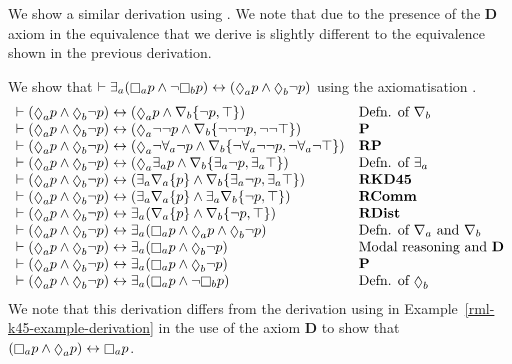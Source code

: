 \pagebreak

We show a similar derivation using \axiomRmlKD{}.
We note that due to the presence of the {\bf D} axiom in \axiomRmlKD{} the equivalence that we derive is slightly different to the equivalence shown in the previous derivation.

\begin{example}\label{rml-kd45-example-derivation}
We show that $\proves \somerefsA (\necessaryA \atomP \land \lnot \necessaryB \atomP) \iff (\possibleA \atomP \land \possibleB \lnot \atomP)$ using the axiomatisation \axiomRmlKD{}.
$$
\begin{array}{ll}
    \proves (\possibleA \atomP \land \possibleB \lnot \atomP) \iff (\possibleA \atomP \land \coversB \{\lnot \atomP, \top\}) & \text{Defn. of $\coversB$}\\
    \proves (\possibleA \atomP \land \possibleB \lnot \atomP) \iff (\possibleA \lnot \lnot \atomP \land \coversB \{\lnot \lnot \lnot \atomP, \lnot \lnot \top\}) & {\bf P}\\
    \proves (\possibleA \atomP \land \possibleB \lnot \atomP) \iff (\possibleA \lnot \allrefsA \lnot \atomP \land \coversB \{\lnot \allrefsA \lnot \lnot \atomP, \lnot \allrefsA \lnot \top\}) & {\bf RP}\\
    \proves (\possibleA \atomP \land \possibleB \lnot \atomP) \iff (\possibleA \somerefsA \atomP \land \coversB \{\somerefsA \lnot \atomP, \somerefsA \top\}) & \text{Defn. of $\somerefsA$}\\
    \proves (\possibleA \atomP \land \possibleB \lnot \atomP) \iff (\somerefsA \coversA \{\atomP\} \land \coversB \{\somerefsA \lnot \atomP, \somerefsA \top\}) & {\bf RKD45}\\
    \proves (\possibleA \atomP \land \possibleB \lnot \atomP) \iff (\somerefsA \coversA \{\atomP\} \land \somerefsA \coversB \{\lnot \atomP, \top\}) & {\bf RComm}\\
    \proves (\possibleA \atomP \land \possibleB \lnot \atomP) \iff \somerefsA (\coversA \{\atomP\} \land \coversB \{\lnot \atomP, \top\}) & {\bf RDist}\\
    \proves (\possibleA \atomP \land \possibleB \lnot \atomP) \iff \somerefsA (\necessaryA \atomP \land \possibleA \atomP \land \possibleB \lnot \atomP) & \text{Defn. of $\coversA$ and $\coversB$}\\
    \proves (\possibleA \atomP \land \possibleB \lnot \atomP) \iff \somerefsA (\necessaryA \atomP \land \possibleB \lnot \atomP) & \text{Modal reasoning and {\bf D}}\\
    \proves (\possibleA \atomP \land \possibleB \lnot \atomP) \iff \somerefsA (\necessaryA \atomP \land \possibleB \lnot \atomP) & {\bf P}\\
    \proves (\possibleA \atomP \land \possibleB \lnot \atomP) \iff \somerefsA (\necessaryA \atomP \land \lnot \necessaryB \atomP) & \text{Defn. of $\possibleB$}
\end{array}
$$
We note that this derivation differs from the derivation using \axiomRmlKFF{} in Example~\ref{rml-k45-example-derivation} in the use of the axiom {\bf D} to show that $(\necessaryA \atomP \land \possibleA \atomP) \iff \necessaryA \atomP$.
\end{example}

